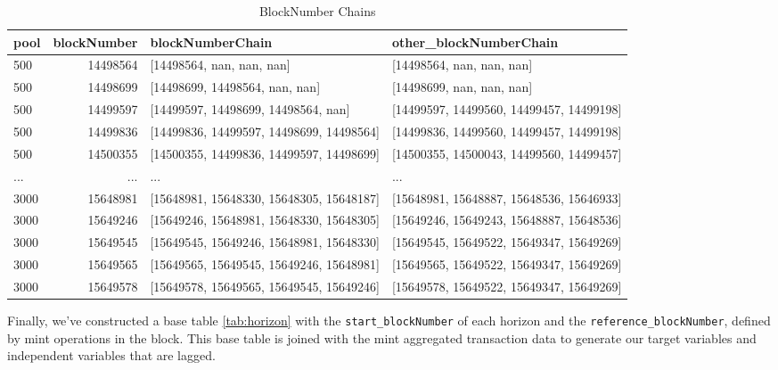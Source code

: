 \documentclass{article}
\begin{document}
{\begin{table}[htbp]
  \centering
  \small
  \begin{tabularx}{\linewidth}{|X|r|l|l|}
    \hline
    \textbf{pool} & \textbf{blockNumber} & \textbf{blockNumberChain} & \textbf{other\_blockNumberChain} \\
    \hline
    500 & 14498564 & [14498564, nan, nan, nan] & [14498564, nan, nan, nan] \\
    500 & 14498699 & [14498699, 14498564, nan, nan] & [14498699, nan, nan, nan] \\
    500 & 14499597 & [14499597, 14498699, 14498564, nan] & [14499597, 14499560, 14499457, 14499198] \\
    500 & 14499836 & [14499836, 14499597, 14498699, 14498564] & [14499836, 14499560, 14499457, 14499198] \\
    500 & 14500355 & [14500355, 14499836, 14499597, 14498699] & [14500355, 14500043, 14499560, 14499457] \\
    ... & ... & ... & ... \\
    3000 & 15648981 & [15648981, 15648330, 15648305, 15648187] & [15648981, 15648887, 15648536, 15646933] \\
    3000 & 15649246 & [15649246, 15648981, 15648330, 15648305] & [15649246, 15649243, 15648887, 15648536] \\
    3000 & 15649545 & [15649545, 15649246, 15648981, 15648330] & [15649545, 15649522, 15649347, 15649269] \\
    3000 & 15649565 & [15649565, 15649545, 15649246, 15648981] & [15649565, 15649522, 15649347, 15649269] \\
    3000 & 15649578 & [15649578, 15649565, 15649545, 15649246] & [15649578, 15649522, 15649347, 15649269] \\
    \hline
  \end{tabularx}
  \caption{BlockNumber Chains}
  \label{tab:chains}
\end{table}

Finally, we've constructed a base table \ref{tab:horizon} with the \texttt{start\_blockNumber} of each horizon and the \texttt{reference\_blockNumber}, defined by mint operations in the block. This base table is joined with the mint aggregated transaction data to generate our target variables and independent variables that are lagged.

}
\end{document}
